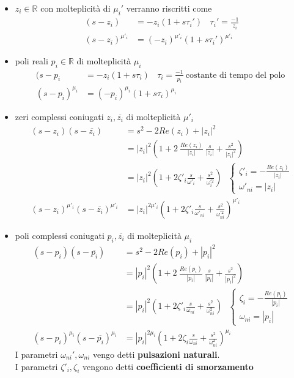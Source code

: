 \documentclass{article}
\theoremstyle{definition}
\newcommand{\R}{\mathbb{R}}
\begin{document}
 \begin{itemize}
\item $z_i \in \R$ con molteplicità di $\mu_i'$ verranno riscritti come 
\begin{align*}
	(s-z_i)&=-z_i (1+s\tau_i') \ \ \ \ \tau_i'=\frac{-1}{z_i} \\
		(s-z_i)^{\mu'_i}&=(-z_i)^{\mu'_i} (1+s\tau_i')^{\mu'_i} 
\end{align*}
\item poli reali  $p_i \in \R$ di molteplicità $\mu_i$
\begin{align*}
	(s-p_i&=-z_i (1+s\tau_i) \ \ \ \ \tau_i=\frac{-1}{p_i} \ \text{costante di tempo del polo } \\
	(s-p_i)^{\mu_i}&=(-p_i)^{\mu_i} (1+s\tau_i)^{\mu_i} 
\end{align*}
\item zeri complessi coniugati $z_i ,\overline{z_i}$ di molteplicità $\mu'_i$
 \begin{align*}
 	(s-z_i)(s-\overline{z_i})&=s^2 - 2 Re(z_i)+|z_i|^2\\
 	&=|z_i|^2\left(1+2 \ \frac{Re(z_i)}{|z_i|} \ \frac{s}{|z_i|}+\frac{s^2}{|z_i|^2}\right) \\
 	&=|z_i|^2\left(1+2\zeta'_i \frac{s}{\omega'_i}+\frac{s^2}{\omega^{'2}_i} \right) \ \ \  
 	\begin{cases}
 	\zeta'_i=-\frac{Re(z_i)}{|z_i|} \\
 	\omega'_{ni}=|z_i|
 	\end{cases}\\ 
 	(s-z_i)^{\mu'_i}(s-\overline{z_i})^{\mu'_i}&=|z_i|^{2\mu'_i}\left(1+2\zeta'_i \frac{s}{\omega'_{ni}}+\frac{s^2}{\omega^{'2}_{ni} }\right)^{\mu'_{i}}
\end{align*}
\item poli complessi coniugati $p_i ,\overline{z_i}$ di molteplicità $\mu_i$
\begin{align*}
	(s-p_i)(s-\overline{p_i})&=s^2 - 2 Re(p_i)+|p_i|^2\\
	&=|p_i|^2\left(1+2 \ \frac{Re(p_i)}{|p_i|} \ \frac{s}{|p_i|}+\frac{s^2}{|p_i|^2}\right) \\
	&=|p_i|^2\left(1+2\zeta'_i \frac{s}{\omega_{ni}}+\frac{s^2}{\omega^{2}_{ni}} \right) \ \ \  
	\begin{cases}
		\zeta_i=-\frac{Re(p_i)}{|p_i|} \\
		\omega_{ni}=|p_i|
	\end{cases}\\ 
	(s-p_i)^{\mu_i}(s-\overline{p_i})^{\mu_i}&=|p_i|^{2\mu_i}\left(1+2\zeta_i \frac{s}{\omega_{ni}}+\frac{s^2}{\omega^{2}_{ni}} \right) ^{\mu_i}
\end{align*}
I parametri $\omega_{ni}',\omega_{ni}$ vengo detti \textbf{pulsazioni naturali}.\\
I parametri $\zeta'_i , \zeta_i$ vengono detti \textbf{coefficienti di smorzamento }
\end{itemize}
\end{document}
